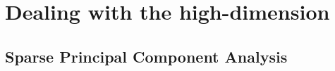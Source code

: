 \documentclass[12pt,a4paper]{article}
\begin{document}
\begin{remark}
\end{remark}











\section{Dealing with the high-dimension}

\subsection{Sparse Principal Component Analysis}
\label{sec:sPCA}




\newpage


\end{document}
